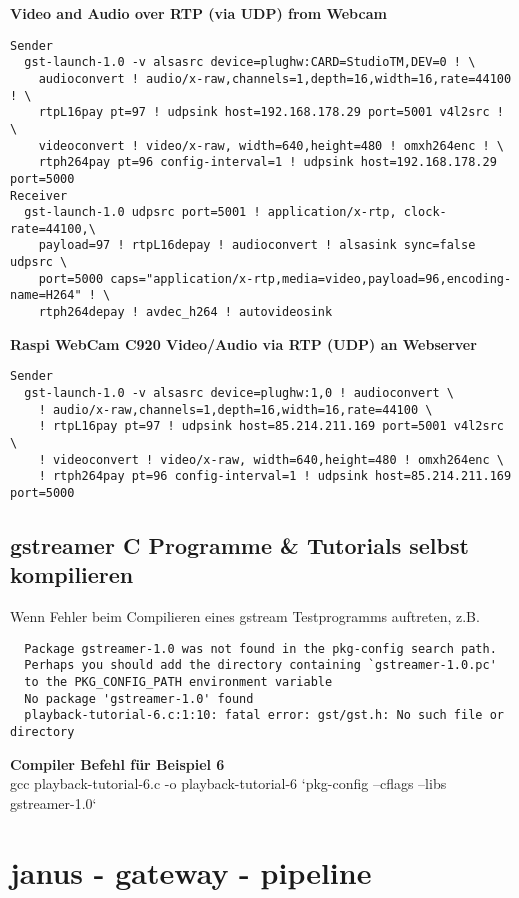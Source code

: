 \textbf{Video and Audio over RTP (via UDP) from Webcam}
\begin{verbatim}
Sender
  gst-launch-1.0 -v alsasrc device=plughw:CARD=StudioTM,DEV=0 ! \
    audioconvert ! audio/x-raw,channels=1,depth=16,width=16,rate=44100 ! \
    rtpL16pay pt=97 ! udpsink host=192.168.178.29 port=5001 v4l2src ! \
    videoconvert ! video/x-raw, width=640,height=480 ! omxh264enc ! \
    rtph264pay pt=96 config-interval=1 ! udpsink host=192.168.178.29 port=5000
Receiver
  gst-launch-1.0 udpsrc port=5001 ! application/x-rtp, clock-rate=44100,\
    payload=97 ! rtpL16depay ! audioconvert ! alsasink sync=false udpsrc \
    port=5000 caps="application/x-rtp,media=video,payload=96,encoding-name=H264" ! \
    rtph264depay ! avdec_h264 ! autovideosink
\end{verbatim}


\textbf{Raspi WebCam C920 Video/Audio via RTP (UDP) an Webserver}
\begin{verbatim}
Sender
  gst-launch-1.0 -v alsasrc device=plughw:1,0 ! audioconvert \
    ! audio/x-raw,channels=1,depth=16,width=16,rate=44100 \
    ! rtpL16pay pt=97 ! udpsink host=85.214.211.169 port=5001 v4l2src \
    ! videoconvert ! video/x-raw, width=640,height=480 ! omxh264enc \
    ! rtph264pay pt=96 config-interval=1 ! udpsink host=85.214.211.169 port=5000
\end{verbatim}

\subsection{gstreamer C Programme \& Tutorials selbst kompilieren}

Wenn Fehler beim Compilieren eines gstream Testprogramms auftreten, z.B.
\begin{verbatim}
  Package gstreamer-1.0 was not found in the pkg-config search path.
  Perhaps you should add the directory containing `gstreamer-1.0.pc'
  to the PKG_CONFIG_PATH environment variable
  No package 'gstreamer-1.0' found
  playback-tutorial-6.c:1:10: fatal error: gst/gst.h: No such file or directory
\end{verbatim}

\textbf{Compiler Befehl für Beispiel 6}\\
gcc playback-tutorial-6.c -o playback-tutorial-6 `pkg-config --cflags --libs gstreamer-1.0`

\section{janus - gateway - pipeline}

